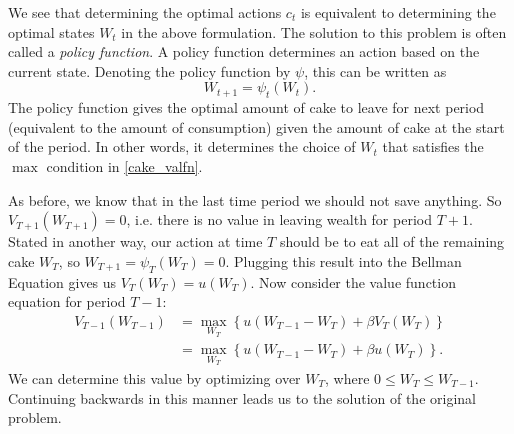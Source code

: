 We see that determining the optimal actions $c_t$ is equivalent to determining the optimal states $W_{t}$ in the
above formulation. The solution to this
problem is often called a \emph{policy function}.  A policy function determines an action based on the current
state.  Denoting the policy function by $\psi$, this can be written as
\begin{equation*}
W_{t+1}=\psi_t \left(W_t\right).
\end{equation*}
The policy function gives the optimal amount of cake to leave for next period (equivalent to the amount of consumption) given
the amount of cake at the start of the period.  In other words, it determines the choice of $W_t$ that satisfies the $\max$
condition in \eqref{cake_valfn}.

As before, we know that in the last time period we should not save anything.  So $V_{T+1}(W_{T+1}) = 0$, i.e. there is
no value in leaving wealth for period $T+1$. Stated in another way, our action at time $T$ should be to eat all of the
remaining cake $W_T$, so $W_{T+1} = \psi_T(W_T) = 0$.
Plugging this result into the Bellman Equation gives us $V_T(W_T) = u(W_T)$.
Now consider the value function equation for period $T-1$:
\begin{align*}
V_{T-1}(W_{T-1}) &= \max_{W_T} \left\{u(W_{T-1} - W_T) + \beta V_T(W_T)\right\} \\
                 &= \max_{W_T} \left\{u(W_{T-1} - W_T) + \beta u(W_T)\right\}.
\end{align*}
We can determine this value by optimizing over $W_T$, where $0 \leq W_T \leq W_{T-1}$.
Continuing backwards in this manner leads us to the solution of the original problem.

